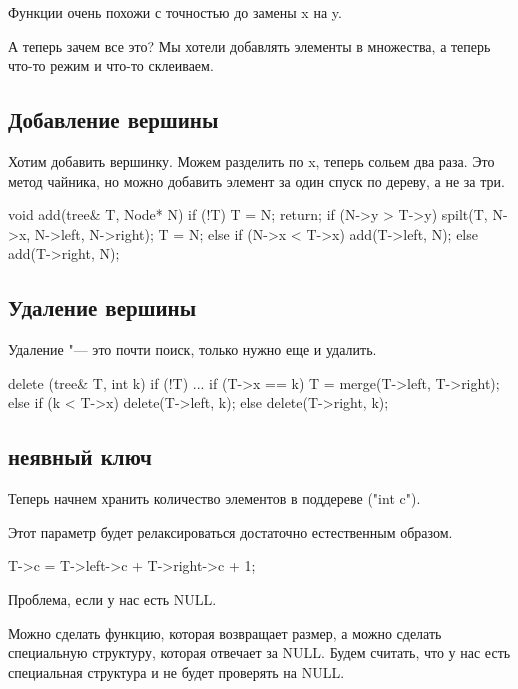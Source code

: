 Функции очень похожи с точностью до замены x на y.

А теперь зачем все это? Мы хотели добавлять элементы в множества, а теперь что-то режим и что-то склеиваем.

\subsection{Добавление вершины}

Хотим добавить вершинку. Можем разделить по x, теперь сольем два раза. Это метод чайника, но можно добавить элемент за один 
спуск по дереву, а не за три. 

\begin{cppcode}
void add(tree& T, Node* N) {
    if (!T) {
        T = N;
        return;
    }
    if (N->y > T->y) {
       spilt(T, N->x, N->left, N->right);
       T = N; 
    } else if (N->x < T->x) {
        add(T->left, N);
    } else {
        add(T->right, N);
    }
}
\end{cppcode}

\subsection{Удаление вершины}

Удаление "--- это почти поиск, только нужно еще и удалить.

\begin{cppcode}
delete (tree& T, int k) {
    if (!T) {...}
    if (T->x == k) {
        T = merge(T->left, T->right);
    } else {
        if (k < T->x) {
            delete(T->left, k);
        } else {
            delete(T->right, k);
        }
    }
}
\end{cppcode}

\subsection{неявный ключ}

Теперь начнем хранить количество элементов в поддереве (\cpp"int c").

Этот параметр будет релаксироваться достаточно естественным образом.

\begin{cppcode}
T->c = T->left->c + T->right->c + 1;
\end{cppcode}

Проблема, если у нас есть NULL. 

Можно сделать функцию, которая возвращает размер,
а можно сделать специальную структуру, которая отвечает за NULL. Будем считать, что у нас есть специальная структура и
не будет проверять на NULL.


